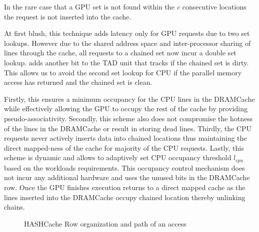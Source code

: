 In the rare case that a GPU set is not found within the \textit{c} consecutive locations the request is not inserted into the cache.
\par At first blush, this technique adds latency only for GPU requests due to two set lookups. However due to the shared address space and inter-processor sharing of lines through the cache, all requests to a chained set now incur a double set lookup. \cachename adds another bit to the TAD unit that tracks if the chained set is dirty. This allows us to avoid the second set lookup for CPU if the parallel memory access has returned and the chained set is clean. 
\par Firstly, this ensures a minimum occupancy for the CPU lines in the DRAMCache while effectively allowing the GPU to occupy the rest of the cache by providing pseudo-associativity. Secondly, this scheme also does not compromise the hotness of the lines in the DRAMCache or result in storing dead lines. Thirdly, the CPU requests never actively inserts data into chained locations thus maintaining the direct mapped-ness of the cache for majority of the CPU requests. Lastly, this scheme is dynamic and allows to adaptively set CPU occupancy threshold \textit{$l_{cpu}$} based on the workloads requirements. This occupancy control mechanism does not incur any additional hardware and uses the unused bits in the DRAMCache row. Once the GPU finishes execution \cachename returns to a direct mapped cache as the lines inserted into the DRAMCache occupy chained location thereby unlinking chains. 


\begin{figure*}[!htb]
    \centering
    \chainaccess
    \caption{HASHCache Row organization and path of an access}
    \label{fig:chain-access}
\end{figure*}